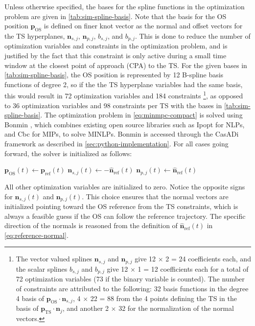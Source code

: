 Unless otherwise specified, the bases for the spline functions in the optimization problem are given in \cref{tab:sim-spline-basis}. Note that the basis for the OS position $\mathbf p_\text{OS}$ is defined on finer knot vector as the normal and offset vectors for the TS hyperplanes, $\mathbf n_{s,j}$, $\mathbf n_{p,j}$, $b_{s,j}$, and $b_{p,j}$. This is done to reduce the number of optimization variables and constraints in the optimization problem, and is justified by the fact that this constraint is only active during a small time window at the closest point of approach (CPA) to the TS. For the given bases in \cref{tab:sim-spline-basis}, the OS position is represented by 12 B-spline basis functions of degree 2, so if the the TS hyperplane variables had the same basis, this would result in 72 optimization variables and 184 constraints
\footnote{The vector valued splines $\mathbf n_{s,j}$ and $\mathbf n_{p,j}$ give 12 $\times$ 2 = 24 coefficients each, and the scalar splines $b_{s,j}$ and $b_{p,j}$ give 12 $\times$ 1 = 12 coefficients each for a total of 72 optimization variables (73 if the binary variable is counted). The number of constraints are attributed to the following: 32 basis functions in the degree 4 basis of $\mathbf p_\text{OS}\cdot\mathbf{n}_{s,j}$, 4 $\times$ 22 = 88 from the 4 points defining the TS in the basis of $\mathbf p_\text{TS}\cdot\mathbf n_j$, and another 2 $\times$ 32 for the normalization of the normal vectors.}, 
as opposed to 36 optimization variables and 98 constraints per TS with the bases in \cref{tab:sim-spline-basis}.
The optimization problem in \cref{eq:minmpc-compact} is solved using Bonmin \citep{bonmin2008}, which combines existing open source libraries such as Ipopt \citep{ipopt2006} for NLPs, and Cbc \citep{cbc2005} for MIPs, to solve MINLPs. Bonmin is accessed through the CasADi framework as described in \cref{sec:python-implementation}. 
For all cases going forward, the solver is initialized as follows:
\begin{algorithmic}
    \centering
    \State $\mathbf p_\text{OS}(t) \gets \mathbf p_\text{ref}(t)$
        \State $\mathbf n_{s,j}(t) \gets -\mathbf{\hat n}_\text{ref}(t)$
        \State $\mathbf n_{p,j}(t) \gets \mathbf{\hat n}_\text{ref}(t)$
    \EndFor
\end{algorithmic}
All other optimization variables are initialized to zero. Notice the opposite signs for $\mathbf n_{s,j}(t)$ and $\mathbf n_{p,j}(t)$.
This choice ensures that the normal vectors are initialized pointing toward the OS reference from the TS constraints, which is always a feasible guess if the OS can follow the reference trajectory. 
The specific direction of the normals is reasoned from the definition of $\mathbf{\hat n}_\text{ref}(t)$ in \cref{eq:reference-normal}.

